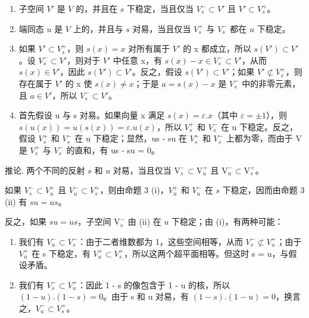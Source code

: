 \begin{enumerate}
\def\labelenumi{(\roman{enumi})}
\item
子空间 \(V'\) 是 \(V\) 的，并且在 \(s\) 下稳定，当且仅当 \(V_s^- \subset V'\) 且 \(V' \subset V_s^+\)。
\item
端同态 \(u\) 是 \(V\) 上的，并且与 \(s\) 对易，当且仅当 \(V_s^+\) 与 \(V_s^-\) 都在 \(u\) 下稳定。
\item
如果 \(V' \subset V_{s}^{+}\)，则 \(s(x) = x\) 对所有属于 \(V'\) 的 x 都成立，所以 \(s(V') \subset V'\)。设 \(V_{s}^{-} \subset V'\)，则对于 \(V'\) 中任意 x，有 \(s(x) - x \in V_{s}^{-} \subset V'\)，从而 \(s(x) \in V'\)，因此 \(s(V') \subset V'\)。反之，假设 \(s(V') \subset V'\)；如果 \(V' \not\subset V_{s}^{+}\)，则存在属于 \(V'\) 的 x 使 \(s(x) \neq x\)；于是 \(a = s(x) - x\) 是 \(V_{s}^{-}\) 中的非零元素，且 \(a \in V'\)，所以 \(V_{s}^{-} \subset V'\)。
\item
  首先假设 u 与 s 对易。如果向量 x 满足 \(s(x) = \varepsilon.x\)（其中 \(\varepsilon = \pm1\)），则 \(s(u(x)) = u(s(x)) = \varepsilon.u(x)\)，所以 \(V_{s}^{+}\) 和 \(V_{s}^{-}\) 在 u 下稳定。反之，假设 \(V_{s}^{+}\) 和 \(V_{s}^{-}\) 在 u 下稳定；显然，us - su 在 \(V_{s}^{+}\) 和 \(V_{s}^{-}\) 上都为零，而由于 V 是 \(V_{s}^{+}\) 与 \(V_{s}^{-}\) 的直和，有 us - su = 0。
\end{enumerate}

推论. 两个不同的反射 \(s\) 和 \(u\) 对易，当且仅当 \(\mathrm{V}_s^- \subset \mathrm{V}_u^+\) 且 \(\mathrm{V}_u^- \subset \mathrm{V}_s^+\)。

如果 \(V_{s}^{-} \subset V_{u}^{+}\) 且 \(V_{u}^{-} \subset V_{s}^{+}\)，则由命题 3 (i)，\(V_{u}^{+}\) 和 \(V_{u}^{-}\) 在 \(s\) 下稳定，因而由命题 3 (ii) 有 \(su = us\)。

反之，如果 \(su = us\)，子空间 \(\mathrm{V}_{s}^{-}\) 由 (ii) 在 \(u\) 下稳定；由 (i)，有两种可能：

\begin{enumerate}
\def\labelenumi{\alph{enumi})}
\item
  我们有 \(V_{u}^{-} \subset V_{s}^{-}\)：由于二者维数都为 1，这些空间相等，从而 \(V_{s}^{-} \not\subset V_{u}^{+}\)；由于 \(V_{u}^{+}\) 在 s 下稳定，有 \(V_{u}^{+} \subset V_{s}^{+}\)，所以这两个超平面相等。但这时 s = u，与假设矛盾。
\item
  我们有 \(V_{s}^{-} \subset V_{u}^{+}\)：因此 1 - s 的像包含于 1 - u 的核，所以 \((1 - u).(1 - s) = 0\)。由于 s 和 u 对易，有 \((1 - s).(1 - u) = 0\)，换言之，\(V_{u}^{-} \subset V_{s}^{+}\)。
\end{enumerate}

